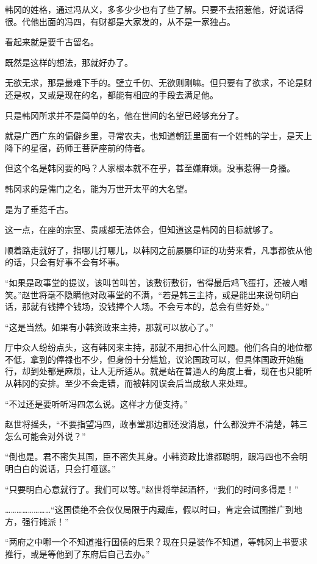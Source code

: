 韩冈的姓格，通过冯从义，多多少少也有了些了解。只要不去招惹他，好说话得很。代他出面的冯四，有财都是大家发的，从不是一家独占。

看起来就是要千古留名。

既然是这样的想法，那就好办了。

无欲无求，那是最难下手的。壁立千仞、无欲则刚嘛。但只要有了欲求，不论是财还是权，又或是现在的名，都能有相应的手段去满足他。

只是韩冈所求并不是简单的名，他在世间的名望已经够充分了。

就是广西广东的偏僻乡里，寻常农夫，也知道朝廷里面有一个姓韩的学士，是天上降下的星宿，药师王菩萨座前的侍者。

但这个名是韩冈要的吗？人家根本就不在乎，甚至嫌麻烦。没事惹得一身搔。

韩冈求的是儒门之名，能为万世开太平的大名望。

是为了垂范千古。

这一点，在座的宗室、贵戚都无法体会，但知道这是韩冈的目标就够了。

顺着路走就好了，指哪儿打哪儿，以韩冈之前屡屡印证的功劳来看，凡事都依从他的话，只会有好事不会有坏事。

“如果是政事堂的提议，该叫苦叫苦，该敷衍敷衍，省得最后鸡飞蛋打，还被人嘲笑。”赵世将毫不隐瞒他对政事堂的不满，“若是韩三主持，或是能出来说句明白话，那就有钱捧个钱场，没钱捧个人场。不会亏本的，总会有些好处。”

“这是当然。如果有小韩资政来主持，那就可以放心了。”

厅中众人纷纷点头，这有韩冈来主持，那就不用担心什么问题。他们各自的地位都不低，拿到的俸禄也不少，但身份十分尴尬，议论国政可以，但具体国政开始施行，却到处都是麻烦，让人无所适从。就是站在普通人的角度上看，现在也只能听从韩冈的安排。至少不会走错，而被韩冈误会后当成敌人来处理。

“不过还是要听听冯四怎么说。这样才方便支持。”

赵世将摇头，“不要指望冯四，政事堂那边都还没消息，什么都没弄不清楚，韩三怎么可能会对外说？”

“倒也是。君不密失其国，臣不密失其身。小韩资政比谁都聪明，跟冯四也不会明明白白的说话，只会打哑谜。”

“只要明白心意就行了。我们可以等。”赵世将举起酒杯，“我们的时间多得是！”

……………………“这国债绝不会仅仅局限于内藏库，假以时曰，肯定会试图推广到地方，强行摊派！”

“两府之中哪一个不知道推行国债的后果？现在只是装作不知道，等韩冈上书要求推行，或是等他到了东府后自己去办。”

